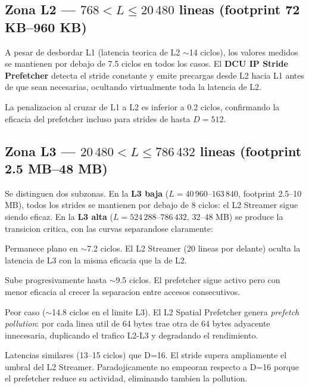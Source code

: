 \documentclass[12pt,a4paper]{article}
\begin{document}
\subsection{Zona L2 --- $768 < L \leq 20\,480$ lineas (footprint 72 KB--960 KB)}

A pesar de desbordar L1 (latencia teorica de L2 $\sim$14 ciclos), los valores medidos se mantienen por debajo de 7.5 ciclos en todos los casos. El \textbf{DCU IP Stride Prefetcher} detecta el stride constante y emite precargas desde L2 hacia L1 antes de que sean necesarias, ocultando virtualmente toda la latencia de L2.

La penalizacion al cruzar de L1 a L2 es inferior a 0.2 ciclos, confirmando la eficacia del prefetcher incluso para strides de hasta $D=512$.

\subsection{Zona L3 --- $20\,480 < L \leq 786\,432$ lineas (footprint 2.5 MB--48 MB)}

Se distinguen dos subzonas. En la \textbf{L3 baja} ($L = 40\,960$--$163\,840$, footprint 2.5--10 MB), todos los strides se mantienen por debajo de 8 ciclos: el L2 Streamer sigue siendo eficaz. En la \textbf{L3 alta} ($L = 524\,288$--$786\,432$, 32--48 MB) se produce la transicion critica, con las curvas separandose claramente:

\begin{description}[leftmargin=1.5em]
  \item[$D=1$:] Permanece plano en $\sim$7.2 ciclos. El L2 Streamer (20 lineas por delante) oculta la latencia de L3 con la misma eficacia que la de L2.
  \item[$D=8$:] Sube progresivamente hasta $\sim$9.5 ciclos. El prefetcher sigue activo pero con menor eficacia al crecer la separacion entre accesos consecutivos.
  \item[$D=16$:] Peor caso ($\sim$14.8 ciclos en el limite L3). El L2 Spatial Prefetcher genera \emph{prefetch pollution}: por cada linea util de 64 bytes trae otra de 64 bytes adyacente innecesaria, duplicando el trafico L2-L3 y degradando el rendimiento.
  \item[$D \geq 64$ hasta $D=512$:] Latencias similares (13--15 ciclos) que D=16. El stride supera ampliamente el umbral del L2 Streamer. Paradojicamente no empeoran respecto a D=16 porque el prefetcher reduce su actividad, eliminando tambien la pollution.
\end{description}
\end{document}
